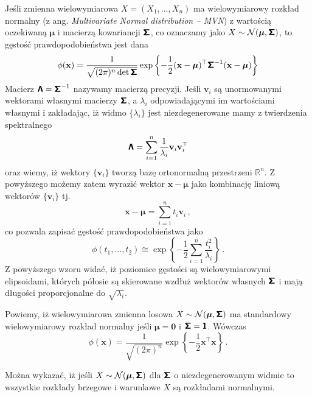 \documentclass{myclass}
\begin{document}
Jeśli zmienna wielowymiarowa \(X = (X_1, \ldots, X_n)\) ma wielowymiarowy rozkład normalny (z ang.
\textit{Multivariate Normal distribution -- MVN}) z wartością oczekiwaną \(\boldsymbol{\mu}\) i
macierzą kowariancji \(\boldsymbol{\mathsf{\Sigma}}\), co oznaczamy jako \(X \sim \mathcal{N}(\boldsymbol{\mu},
\boldsymbol{\mathsf{\Sigma}})\), to gęstość prawdopodobieństwa jest dana
\begin{equation*}
    \phi(\mathbf{x}) = \frac{1}{\sqrt{(2\pi)^n\det\boldsymbol{\mathsf{\Sigma}}}}\exp\left\{-\frac{1}{2}(\mathbf{x} - \boldsymbol{\mu})^\top\boldsymbol{\mathsf{\Sigma}}^{-1}(\mathbf{x} - \boldsymbol{\mu})\right\}
\end{equation*}
Macierz \(\boldsymbol{\mathsf{\Lambda}} = \boldsymbol{\mathsf{\Sigma}}^{-1}\) nazywamy macierzą precyzji. Jeśli \(\mathbf{v}_i\)
są unormowanymi wektorami własnymi macierzy \(\boldsymbol{\mathsf{\Sigma}}\), a \(\lambda_i\) odpowiadającymi im
wartościami własnymi i zakładając, iż widmo \(\{\lambda_i\}\) jest niezdegenerowane mamy z
twierdzenia spektralnego
\begin{equation*}
    \boldsymbol{\mathsf{\Lambda}} = \sum_{i=1}^n\frac{1}{\lambda_i}\mathbf{v}_i\mathbf{v}_i^\top
\end{equation*}
oraz wiemy, iż wektory \(\{\mathbf{v}_i\}\) tworzą bazę ortonormalną przestrzeni \(\mathbb{R}^n\). Z
powyższego możemy zatem wyrazić wektor \(\mathbf{x} - \boldsymbol{\mu}\) jako kombinację liniową
wektorów \(\{\mathbf{v}_i\}\) tj.
\begin{equation*}
    \mathbf{x} - \boldsymbol{\mu} = \sum_{i=1}^n t_i\mathbf{v}_i\,,
\end{equation*}
co pozwala zapisać gęstość prawdopodobieństwa jako
\begin{equation*}
    \phi(t_1,\ldots,t_2) \cong \exp\left\{-\frac{1}{2}\sum_{i=1}^n\frac{t_i^2}{\lambda_i}\right\}\,.
\end{equation*}
Z powyższego wzoru widać, iż poziomice gęstości są wielowymiarowymi elipsoidami, których półosie są
skierowane wzdłuż wektorów własnych \(\boldsymbol{\mathsf{\Sigma}}\) i mają długości proporcjonalne do
\(\sqrt{\lambda_i}\).

Powiemy, iż wielowymiarowa zmienna losowa \(X \sim \mathcal{N}(\boldsymbol{\mu}, \boldsymbol{\mathsf{\Sigma}})\) ma
standardowy wielowymiarowy rozkład normalny jeśli \(\boldsymbol{\mu} = \mathbf{0}\) i
\(\boldsymbol{\mathsf{\Sigma}} = \boldsymbol{\mathsf{1}}\). Wówczas
\begin{equation*}
    \phi(\mathbf{x}) = \frac{1}{\sqrt{(2\pi)^n}}\exp\left\{-\frac{1}{2}\mathbf{x}^\top\mathbf{x}\right\}\,.
\end{equation*}

Można wykazać, iż jeśli \(X \sim \mathcal{N}(\boldsymbol{\mu}, \boldsymbol{\mathsf{\Sigma}})\) dla
\(\boldsymbol{\mathsf{\Sigma}}\) o niezdegenerowanym widmie to wszystkie rozkłady brzegowe i warunkowe \(X\) są
rozkładami normalnymi.
\end{document}
